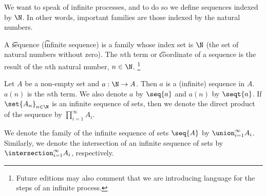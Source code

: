 
We want to speak of infinite processes, and to do so we define sequences indexed by $\N$.
In other words, important families are those indexed by the natural numbers.


A \t{sequence} (\t{infinite sequence}) is a family whose index set is $\N$ (the set of natural numbers without zero).
The \t{$n$th term} or \t{coordinate} of a sequence is the result of the $n$th natural number, $n \in \N$.
  \ifhmode\unskip\fi\footnote{
Future editions may also comment that we are introducing language for the steps of an infinite process.
  }


Let $A$ be a non-empty set and $a: \N \to A$.
Then $a$ is a (infinite) sequence in $A$.
$a(n)$ is the $n$th term.
We also denote $a$ by $\seq{a}$ and $a(n)$ by $\seqt{a}$.
If $\set{A_n}_{n \in \N}$ is an infinite sequence of sets, then we denote the direct product of the sequence by $\prod_{i = 1}^{\infty} A_i$.


We denote the family of the infinite sequence of sets $\seq{A}$ by $\union_{i = 1}^{\infty} A_i$.
Similarly, we denote the intersection of an infinite sequence of sets by $\intersection_{i = 1}^{\infty} A_i$, respectively.

\blankpage
